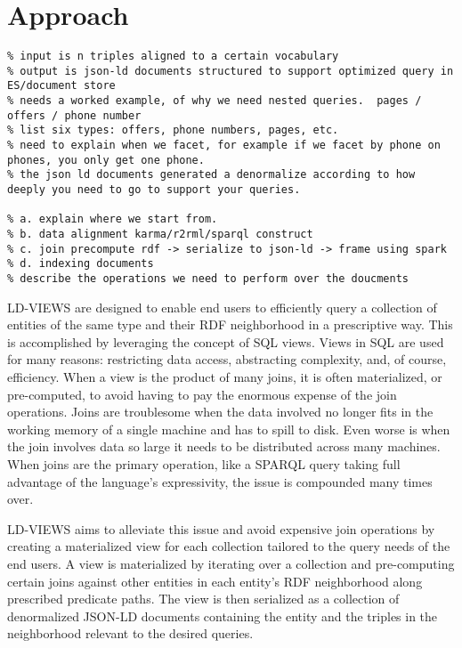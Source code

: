 \section{Approach}
\label{sec:approach}

\begin{verbatim}
% input is n triples aligned to a certain vocabulary
% output is json-ld documents structured to support optimized query in ES/document store
% needs a worked example, of why we need nested queries.  pages / offers / phone number
% list six types: offers, phone numbers, pages, etc.
% need to explain when we facet, for example if we facet by phone on phones, you only get one phone.
% the json ld documents generated a denormalize according to how deeply you need to go to support your queries.

% a. explain where we start from. 
% b. data alignment karma/r2rml/sparql construct 
% c. join precompute rdf -> serialize to json-ld -> frame using spark
% d. indexing documents
% describe the operations we need to perform over the doucments
\end{verbatim}

LD-VIEWS are designed to enable end users to efficiently query a collection of entities of the same type and their RDF neighborhood in a prescriptive way.   
This is accomplished by leveraging the concept of SQL views.  
Views in SQL are used for many reasons: restricting data access, abstracting complexity, and, of course, efficiency. 
When a view is the product of many joins, it is often materialized, or pre-computed, to avoid having to pay the enormous expense of the join operations.  
Joins are troublesome when the data involved no longer fits in the working memory of a single machine and has to spill to disk.  
Even worse is when the join involves data so large it needs to be distributed across many machines.  
When joins are the primary operation, like a SPARQL query taking full advantage of the language's expressivity, the issue is compounded many times over.         

LD-VIEWS aims to alleviate this issue and avoid expensive join operations by creating a materialized view for each collection tailored to the query needs of the end users.  
A view is materialized by iterating over a collection and pre-computing certain joins against other entities in each entity's RDF neighborhood along prescribed predicate paths.  
The view is then serialized as a collection of denormalized JSON-LD documents containing the entity and the triples in the neighborhood relevant to the desired queries.  

